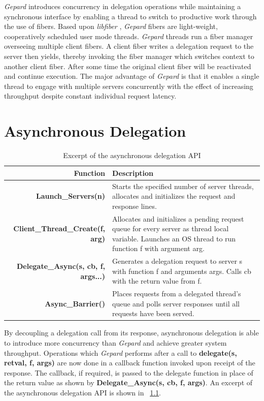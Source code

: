 \documentclass{uicthesi}
\begin{document}
\textit{Gepard} introduces concurrency in delegation operations while maintaining a synchronous interface by enabling a thread to switch to productive work through the use of fibers. Based upon \textit{libfiber} \cite{libfiber}, \textit{Gepard} fibers are light-weight, cooperatively scheduled user mode threads. \textit{Gepard} threads run a fiber manager overseeing multiple client fibers. A client fiber writes a delegation request to the server then yields, thereby invoking the fiber manager which switches context to another client fiber. After some time the original client fiber will be reactivated and continue execution. The major advantage of \textit{Gepard} is that it enables a single thread to engage with multiple servers concurrently with the effect of increasing throughput despite constant individual request latency. 

\chapter{Asynchronous Delegation}

\begin{table}[ht!]
\begin{tabularx}{\linewidth}{| r | X |} %
  \hline
  \bf{Function} & \bf{Description} \\
  \hline
  \bf{Launch\_Servers(n)} & Starts the specified number of server threads, allocates and initializes the request and response lines. \\
  \hline
  \bf{Client\_Thread\_Create(f, arg)} & Allocates and initializes a pending request queue for every server as thread local variable. Launches an OS thread to run function f with argument arg. \\
  \hline
  \bf{Delegate\_Async(s, cb, f, args...)} & Generates a delegation request to server s with function f and arguments args. Calls cb with the return value from f. \\
  \hline
  \bf{Async\_Barrier()} & Places requests from a delegated thread's queue and polls server responses until all requests have been served. \\
  \hline
\end{tabularx}
\label{tab:api}
\caption{Excerpt of the asynchronous delegation API}
\end{table}

By decoupling a delegation call from its response, asynchronous delegation is able to introduce more concurrency than \textit{Gepard} and achieve greater system throughput. Operations which \textit{Gepard} performs after a call to \textbf{delegate(s, retval, f, args)} are now done in a callback function invoked upon receipt of the response. The callback, if required, is passed to the delegate function in place of the return value as shown by \textbf{Delegate\_Async(s, cb, f, args)}. An excerpt of the asynchronous delegation API is shown  in ~\ref{tab:api}. 
\end{document}
